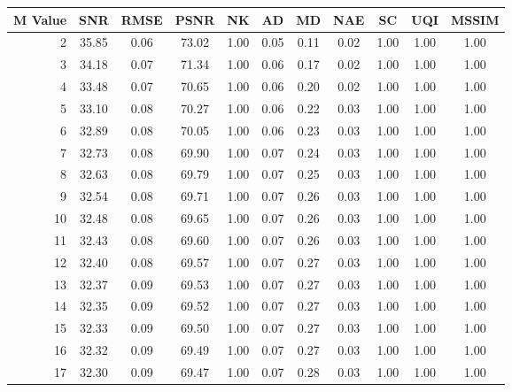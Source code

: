     \begin{table}[htb]
       \small

    \centering 
    \begin{tabular}{|r|cccccccccc|}\hline
   M Value &  SNR &  RMSE &  PSNR &  NK &  AD &  MD &  NAE &  SC &  UQI &  MSSIM \\ \hline 
      2 &  35.85 &  0.06 &  73.02 &  1.00 &  0.05 &  0.11 &  0.02 &  1.00 &  1.00 &  1.00  \\ \hline 
      3 &  34.18 &  0.07 &  71.34 &  1.00 &  0.06 &  0.17 &  0.02 &  1.00 &  1.00 &  1.00  \\ \hline 
      4 &  33.48 &  0.07 &  70.65 &  1.00 &  0.06 &  0.20 &  0.02 &  1.00 &  1.00 &  1.00  \\ \hline 
      5 &  33.10 &  0.08 &  70.27 &  1.00 &  0.06 &  0.22 &  0.03 &  1.00 &  1.00 &  1.00  \\ \hline 
      6 &  32.89 &  0.08 &  70.05 &  1.00 &  0.06 &  0.23 &  0.03 &  1.00 &  1.00 &  1.00  \\ \hline 
      7 &  32.73 &  0.08 &  69.90 &  1.00 &  0.07 &  0.24 &  0.03 &  1.00 &  1.00 &  1.00  \\ \hline 
      8 &  32.63 &  0.08 &  69.79 &  1.00 &  0.07 &  0.25 &  0.03 &  1.00 &  1.00 &  1.00  \\ \hline 
      9 &  32.54 &  0.08 &  69.71 &  1.00 &  0.07 &  0.26 &  0.03 &  1.00 &  1.00 &  1.00  \\ \hline 
      10 &  32.48 &  0.08 &  69.65 &  1.00 &  0.07 &  0.26 &  0.03 &  1.00 &  1.00 &  1.00  \\ \hline 
      11 &  32.43 &  0.08 &  69.60 &  1.00 &  0.07 &  0.26 &  0.03 &  1.00 &  1.00 &  1.00  \\ \hline 
      12 &  32.40 &  0.08 &  69.57 &  1.00 &  0.07 &  0.27 &  0.03 &  1.00 &  1.00 &  1.00  \\ \hline 
      13 &  32.37 &  0.09 &  69.53 &  1.00 &  0.07 &  0.27 &  0.03 &  1.00 &  1.00 &  1.00  \\ \hline 
      14 &  32.35 &  0.09 &  69.52 &  1.00 &  0.07 &  0.27 &  0.03 &  1.00 &  1.00 &  1.00  \\ \hline 
      15 &  32.33 &  0.09 &  69.50 &  1.00 &  0.07 &  0.27 &  0.03 &  1.00 &  1.00 &  1.00  \\ \hline 
      16 &  32.32 &  0.09 &  69.49 &  1.00 &  0.07 &  0.27 &  0.03 &  1.00 &  1.00 &  1.00  \\ \hline 
      17 &  32.30 &  0.09 &  69.47 &  1.00 &  0.07 &  0.28 &  0.03 &  1.00 &  1.00 &  1.00  \\ \hline 

\end{tabular}
\end{table}
